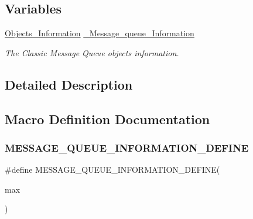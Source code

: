 \subsection*{Variables}
\begin{DoxyCompactItemize}
\item 
\mbox{\label{group__ClassicMessageQueueImpl_ga15fa54eabafccf9786aeee48e05a7737}} 
\mbox{\hyperlink{structObjects__Information}{Objects\+\_\+\+Information}} \mbox{\hyperlink{group__ClassicMessageQueueImpl_ga15fa54eabafccf9786aeee48e05a7737}{\+\_\+\+Message\+\_\+queue\+\_\+\+Information}}
\begin{DoxyCompactList}\small\item\em The Classic Message Queue objects information. \end{DoxyCompactList}\end{DoxyCompactItemize}


\subsection{Detailed Description}


\subsection{Macro Definition Documentation}
\mbox{\label{group__ClassicMessageQueueImpl_gaf22b09b3480cc964301b78ac310afde9}} 
\subsubsection{\texorpdfstring{MESSAGE\_QUEUE\_INFORMATION\_DEFINE}{MESSAGE\_QUEUE\_INFORMATION\_DEFINE}}
{\footnotesize\ttfamily \#define M\+E\+S\+S\+A\+G\+E\+\_\+\+Q\+U\+E\+U\+E\+\_\+\+I\+N\+F\+O\+R\+M\+A\+T\+I\+O\+N\+\_\+\+D\+E\+F\+I\+NE(\begin{DoxyParamCaption}\item[{}]{max }\end{DoxyParamCaption})}


